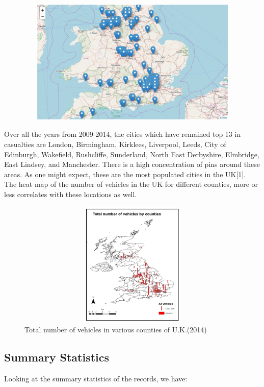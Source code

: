 \documentclass[a4paper, 10pt]{article}
\begin{document}
    \begin{center}
      \includegraphics[width=70cm,height=6cm, scale=0.4,keepaspectratio]{map2.png}
    \end{center}

 Over all the years from 2009-2014, the cities which have remained top 13 in casualties are London, Birmingham, Kirklees, Liverpool, Leeds, City of Edinburgh, Wakefield, Rushcliffe, Sunderland, North East Derbyshire, Elmbridge, East Lindsey, and Manchester. There is a high concentration of pins around these areas. As one might expect, these are the most populated cities in the UK[1]. \\

 The heat map of the number of vehicles in the UK for different counties, more or less correlates with these locations as well.

 \begin{figure}
   \begin{center}
     \includegraphics[width=70cm,height=6cm, scale=0.4,keepaspectratio]{vehicles-by-county.png}
     \caption{Total number of vehicles in various counties of U.K.(2014)}
    \end{center}
  \end{figure}

\subsection{Summary Statistics}
  Looking at the summary statistics of the records, we have: \\
\end{document}
